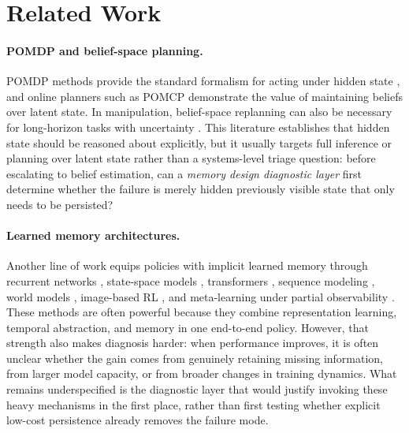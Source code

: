 \section{Related Work}
\label{sec:related-work}

\paragraph{POMDP and belief-space planning.}
POMDP methods provide the standard formalism for acting under hidden state \citep{Kaelbling1998, Spaan2012, Lauri2023}, and online planners such as POMCP \citep{Silver2010} demonstrate the value of maintaining beliefs over latent state. In manipulation, belief-space replanning can also be necessary for long-horizon tasks with uncertainty \citep{Garrett2020}. This literature establishes that hidden state should be reasoned about explicitly, but it usually targets full inference or planning over latent state rather than a systems-level triage question: before escalating to belief estimation, can a \emph{memory design diagnostic layer} first determine whether the failure is merely hidden previously visible state that only needs to be persisted?

\paragraph{Learned memory architectures.}
Another line of work equips policies with implicit learned memory through recurrent networks \citep{Hausknecht2015}, state-space models \citep{Gu2022}, transformers \citep{Vaswani2017, Brohan2023}, sequence modeling \citep{Chen2021}, world models \citep{Ha2018, Hafner2020}, image-based RL \citep{Yarats2021}, and meta-learning under partial observability \citep{Zintgraf2020}. These methods are often powerful because they combine representation learning, temporal abstraction, and memory in one end-to-end policy. However, that strength also makes diagnosis harder: when performance improves, it is often unclear whether the gain comes from genuinely retaining missing information, from larger model capacity, or from broader changes in training dynamics. What remains underspecified is the diagnostic layer that would justify invoking these heavy mechanisms in the first place, rather than first testing whether explicit low-cost persistence already removes the failure mode.

